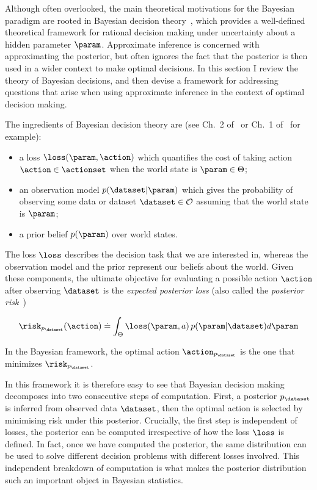 Although often overlooked, the main theoretical motivations for the Bayesian paradigm are rooted in Bayesian decision theory~\citep{berger85decision}, which provides a well-defined theoretical framework for rational decision making under uncertainty about a hidden parameter $\param$. Approximate inference is concerned with approximating the posterior, but often ignores the fact that the posterior is then used in a wider context to make optimal decisions. In this section I review the theory of Bayesian decisions, and then devise a framework for addressing questions that arise when using approximate inference in the context of optimal decision making.

The ingredients of Bayesian decision theory are (see Ch.~2 of~\citep{robert01choice} or Ch.~1 of~\citep{berger85decision} for example):
\vspace{-.3cm}
\begin{itemize}
  \item a loss $\loss(\param,\action)$ which quantifies the cost of taking action $\action \in \actionset$ when the world state is $\param \in \Theta$; %
  \item an observation model $p(\dataset|\param)$ which gives the probability of observing some data or dataset $\dataset \in \mathcal{O}$ assuming that the world state is $\param$;
  \item a prior belief $p(\param)$ over world states.
\end{itemize}

The loss $\loss$ describes the decision task that we are interested in, whereas the observation model and the prior represent our beliefs about the world. Given these components, the ultimate objective for evaluating a possible action $\action$ after observing $\dataset$ is the \emph{expected posterior loss} (also called the \emph{posterior risk}~\citep{schervish95theory})

\begin{equation}
	\risk_{p_\dataset}(\action) \doteq \int_\Theta \loss(\param, a) \, p(\param|\dataset) d\param
\end{equation}

In the Bayesian framework, the optimal action $\action_{p_\dataset}$ is the one that minimizes $\risk_{p_\dataset}$.

In this framework it is therefore easy to see that Bayesian decision making decomposes into two consecutive steps of computation. First, a posterior $p_\dataset$ is inferred from observed data $\dataset$, then the optimal action is selected by minimising risk under this posterior. Crucially, the first step is independent of losses, the posterior can be computed irrespective of how the loss $\loss$ is defined. In fact, once we have computed the posterior, the same distribution can be used to solve different decision problems with different losses involved. This independent breakdown of computation is what makes the posterior distribution such an important object in Bayesian statistics.

